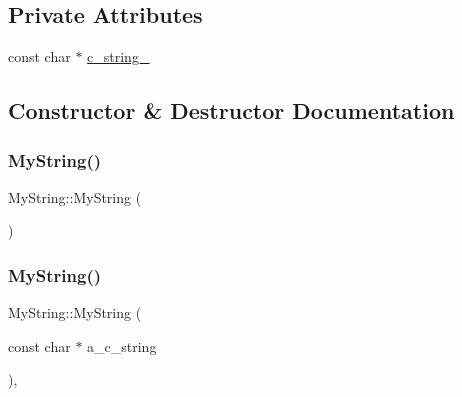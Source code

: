 \subsection*{Private Attributes}
\begin{DoxyCompactItemize}
\item 
const char $\ast$ \hyperlink{classMyString_a1872c0d04ff5f6e654161472b18bb9d0}{c\+\_\+string\+\_\+}
\end{DoxyCompactItemize}


\subsection{Constructor \& Destructor Documentation}
\mbox{\label{classMyString_a1cb17852b83614394b59720779c5f918}} 
\subsubsection{\texorpdfstring{My\+String()}{MyString()}\hspace{0.1cm}{\footnotesize\ttfamily [1/3]}}
{\footnotesize\ttfamily My\+String\+::\+My\+String (\begin{DoxyParamCaption}{ }\end{DoxyParamCaption})\hspace{0.3cm}{\ttfamily [inline]}}

\mbox{\label{classMyString_a28134eb91b6698f46b12accefa157d0f}} 
\subsubsection{\texorpdfstring{My\+String()}{MyString()}\hspace{0.1cm}{\footnotesize\ttfamily [2/3]}}
{\footnotesize\ttfamily My\+String\+::\+My\+String (\begin{DoxyParamCaption}\item[{const char $\ast$}]{a\+\_\+c\+\_\+string }\end{DoxyParamCaption})\hspace{0.3cm}{\ttfamily [inline]}, {\ttfamily [explicit]}}

\mbox{\label{classMyString_ae24c7cf89a58dd2287303df2ac054c66}} 
